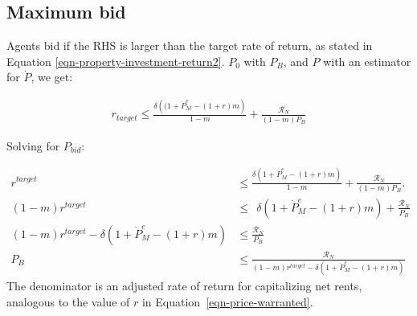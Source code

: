 

\subsection{Maximum bid} %

Agents bid if the RHS is larger than the target rate of return, as stated in Equation \ref{eqn-property-investment-return2}.  $P_0$ with $P_B$, and $\dot P$ with an estimator for $\dot P$, we get: %

\begin{eqnarray}
r_{target} \le \frac{\delta \left((1+ \dot P_M^e - (1+r)m\right)}{1-m} + \frac{\mathcal{R}_N}{(1-m)P_B}
\end{eqnarray}

Solving for $P_{bid}$:

\begin{align}
r^{target} &\le \frac{\delta \left(1 + \dot P_M^e - (1+r)m\right)}{1-m}   +\frac{\mathcal{R}_N}{(1-m)P_B}. \nonumber \\
(1-m)r^{target} &\le \ \ \delta \left(1 + \dot P_M^e - (1+r)m\right) + \frac{\mathcal{R}_N}{P_B} \nonumber \\ %
(1-m)r^{target} - \delta \left(1 + \dot P_M^e - (1+r)m\right)  &\le  \frac{\mathcal{R}_N}{P_B} \nonumber\\
P_B & \le    \frac{\mathcal{R}_N}{(1-m)r^{target}-\delta \left(1 + \dot P_M^e - (1+r)m\right)} 
\label{eqn-bid-price1}
\end{align}
The denominator is an adjusted rate of return for capitalizing net rents, analogous to the value of $r$ in Equation~\ref{eqn-price-warranted}. 

